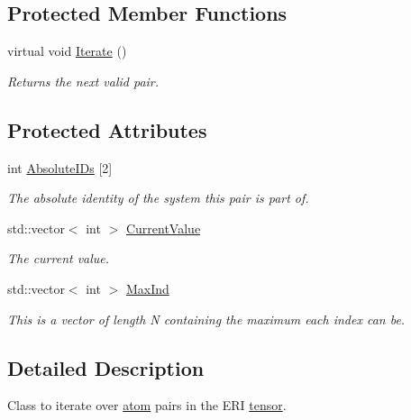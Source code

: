 \subsection*{Protected Member Functions}
\begin{DoxyCompactItemize}
\item 
virtual void \hyperlink{classJKBuilder_1_1PairIterator_a7874a07e98b52f4f147cde6f39353bae}{Iterate} ()
\begin{DoxyCompactList}\small\item\em Returns the next valid pair. \item\end{DoxyCompactList}\end{DoxyCompactItemize}
\subsection*{Protected Attributes}
\begin{DoxyCompactItemize}
\item 
int \hyperlink{classJKBuilder_1_1PairIterator_a5c96d22e39dea8044c7caf8c1213e813}{AbsoluteIDs} \mbox{[}2\mbox{]}
\begin{DoxyCompactList}\small\item\em The absolute identity of the system this pair is part of. \item\end{DoxyCompactList}\item 
std::vector$<$ int $>$ \hyperlink{classJKBuilder_1_1Iterator_a20ca24f6d827aba144bb087c4bcb74a0}{CurrentValue}
\begin{DoxyCompactList}\small\item\em The current value. \item\end{DoxyCompactList}\item 
std::vector$<$ int $>$ \hyperlink{classJKBuilder_1_1Iterator_ab6b56d3c4e9353bc938dd6249cde9ca0}{MaxInd}
\begin{DoxyCompactList}\small\item\em This is a vector of length N containing the maximum each index can be. \item\end{DoxyCompactList}\end{DoxyCompactItemize}


\subsection{Detailed Description}
Class to iterate over \hyperlink{classJKBuilder_1_1atom}{atom} pairs in the ERI \hyperlink{classJKBuilder_1_1tensor}{tensor}. 

